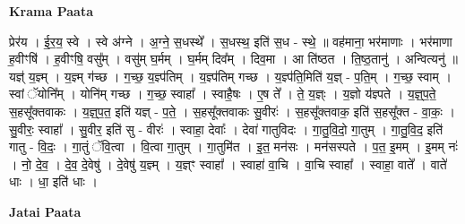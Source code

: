 \documentclass[17pt]{extarticle}
\begin{document}
\textbf{Krama Paata} \newline

प्रेर॑य । ई॒र॒य॒ स्वे । स्वे अ॑ग्ने । अ॒ग्ने॒ स॒धस्थे᳚ । स॒धस्थ॒ इति॑ स॒ध - स्थे॒ ॥ वह॑माना॒ भर॑माणाः । भर॑माणा ह॒वीꣳषि॑ । ह॒वीꣳषि॒ वसु᳚म् । वसु॑म् घ॒र्मम् । घ॒र्मम् दिव᳚म् । दिव॒मा । आ ति॑ष्ठत । ति॒ष्ठ॒तानु॑ । अन्वित्यनु॑ ॥ यज्ञ्॑ य॒ज्ञ्म् । य॒ज्ञ्म् ग॑च्छ । ग॒च्छ॒ य॒ज्ञ्प॑तिम् । य॒ज्ञ्प॑तिम् गच्छ । य॒ज्ञ्प॑ति॒मिति॑ य॒ज्ञ् - प॒ति॒म् । ग॒च्छ॒ स्वाम् । स्वां ॅयोनि᳚म् । योनि॑म् गच्छ । ग॒च्छ॒ स्वाहा᳚ । स्वाहै॒षः । ए॒ष ते᳚ । ते॒ य॒ज्ञ्ः । य॒ज्ञो य॑ज्ञ्पते । य॒ज्ञ्॒प॒ते॒ स॒हसू᳚क्तवाकः । य॒ज्ञ्॒प॒त॒ इति॑ यज्ञ् - प॒ते॒ । स॒हसू᳚क्तवाकः सु॒वीरः॑ । स॒हसू᳚क्तवाक॒ इति॑ स॒हसू᳚क्त - वा॒कः॒ । सु॒वीरः॒ स्वाहा᳚ । सु॒वीर॒ इति॑ सु - वीरः॑ । स्वाहा॒ देवाः᳚ । देवा॑ गातुविदः । गा॒तु॒वि॒दो॒ गा॒तुम् । गा॒तु॒वि॒द॒ इति॑ गातु - वि॒दः॒ । गा॒तुं ॅवि॒त्वा । वि॒त्वा गा॒तुम् । गा॒तुमि॑त । इ॒त॒ मन॑सः । मन॑सस्पते । प॒त॒ इ॒मम् । इ॒मम् नः॑ । नो॒ दे॒व॒ । दे॒व॒ दे॒वेषु॑ । दे॒वेषु॑ य॒ज्ञ्म् । य॒ज्ञ्ꣳ स्वाहा᳚ । स्वाहा॑ वा॒चि । वा॒चि स्वाहा᳚ । स्वाहा॒ वाते᳚ । वाते॑ धाः । धा॒ इति॑ धाः । \newline

\textbf{Jatai Paata} \newline
\end{document}
